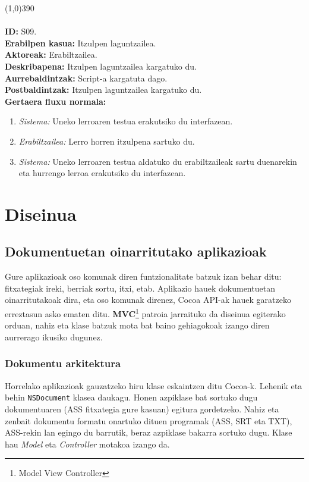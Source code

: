 \line(1,0){390}\\
\noindent\\
\textbf{ID:} S09.\\
\textbf{Erabilpen kasua:} Itzulpen laguntzailea.\\
\textbf{Aktoreak:} Erabiltzailea.\\
\textbf{Deskribapena:} Itzulpen laguntzailea kargatuko du.\\
\textbf{Aurrebaldintzak:} Script-a kargatuta dago.\\
\textbf{Postbaldintzak:} Itzulpen laguntzailea kargatuko du.\\
\textbf{Gertaera fluxu normala:}
\begin{enumerate}
	\item \textit{Sistema:} Uneko lerroaren testua erakutsiko du interfazean.
	\item \textit{Erabiltzailea:} Lerro horren itzulpena sartuko du.
	\item \textit{Sistema:} Uneko lerroaren testua aldatuko du erabiltzaileak sartu duenarekin eta hurrengo lerroa erakutsiko du interfazean.
\end{enumerate}

\newpage
\section{Diseinua}
\subsection{Dokumentuetan oinarritutako aplikazioak}
Gure aplikazioak oso komunak diren funtzionalitate batzuk izan behar ditu: fitxategiak ireki, berriak sortu, itxi, etab. Aplikazio hauek dokumentuetan oinarritutakoak dira, eta oso komunak direnez, Cocoa API-ak hauek garatzeko erreztasun asko ematen ditu. \textbf{MVC}\footnote{Model View Controller} patroia jarraituko da diseinua egiterako orduan, nahiz eta klase batzuk mota bat baino gehiagokoak izango diren aurrerago ikusiko dugunez.
\subsubsection{Dokumentu arkitektura}
Horrelako aplikazioak gauzatzeko hiru klase eskaintzen ditu Cocoa-k. Lehenik eta behin \texttt{NSDocument} klasea daukagu. Honen azpiklase bat sortuko dugu dokumentuaren (ASS fitxategia gure kasuan) egitura gordetzeko. Nahiz eta zenbait dokumentu formatu onartuko dituen programak (ASS, SRT eta TXT), ASS-rekin lan egingo du barrutik, beraz azpiklase bakarra sortuko dugu. Klase hau \textit{Model} eta \textit{Controller} motakoa izango da.

